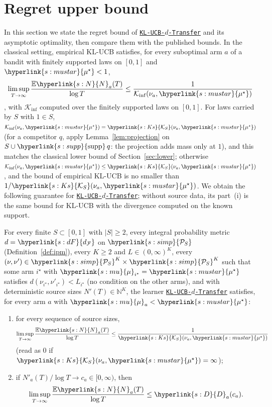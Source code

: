 \documentclass[11pt]{article}
\newcommand{\E}{\mathbb{E}}
\newcommand{\Kinf}{\mathcal{K}_{\inf}}
\newcommand{\sy}[2]{{\hyperlink{#1}{#2}}}
\newcommand{\Simp}{\sy{s:simp}{\mathcal{P}_{S}}}
\newcommand{\supp}{\sy{s:supp}{\mathrm{supp}}}
\newcommand{\Ks}{\sy{s:Ks}{\mathcal{K}_{S}}}
\newcommand{\dF}{\sy{s:dF}{d_{\mathcal F}}}
\newcommand{\mk}{\sy{s:mu}{\mu}}
\newcommand{\mus}{\sy{s:mustar}{\mu^{\star}}}
\newcommand{\Nc}{\sy{s:N}{N}}
\newcommand{\Dc}{\sy{s:D}{D}}
\newcommand{\Alg}{\hyperref[alg:index]{\texttt{KL-UCB-$d$-Transfer}}}
\begin{document}
\section{Regret upper bound}\label{sec:main}\label{sec:upper}

In this section we state the regret bound of \Alg{} and its asymptotic optimality, then compare
them with the published bounds. In the classical setting, empirical KL-UCB satisfies, for every
suboptimal arm $a$ of a bandit with finitely supported laws on $[0,1]$ and $\mus<1$,
\begin{equation*}
\limsup_{T\to\infty}\frac{\E \Nc_a(T)}{\log T}\le\frac{1}{\Kinf(\nu_a,\mus)}
\end{equation*}
\citep[Theorem~2]{CGMMS13}, with $\Kinf$ computed over the finitely supported laws on $[0,1]$. For
laws carried by $S$ with $1\in S$, $\Kinf(\nu_a,\mus)=\Ks(\nu_a,\mus)$ (for a competitor $q$, apply
Lemma~\ref{lem:projection} on $S\cup\supp\,q$: the projection adds mass only at $1$), and this
matches the classical lower bound of Section~\ref{sec:lower}; otherwise $\Kinf(\nu_a,\mus)\le\Ks(\nu_a,\mus)$, and the bound
of empirical KL-UCB is no smaller than $1/\Ks(\nu_a,\mus)$. We obtain the following guarantee for \Alg{}; without source data, its
part~(i) is the same bound for KL-UCB with the divergence computed on the known support.

\begin{theorem}\label{thm:main}
For every finite $S\subset[0,1]$ with $|S|\ge2$, every integral probability metric $d=\dF$
on $\Simp$ (Definition~\ref{def:ipm}), every $K\ge2$ and $L\in(0,\infty)^K$, every
$(\nu,\nu')\in\Simp^K\times\Simp^K$ such that some arm $i^\star$ with $\mk_{i^\star}=\mus$
satisfies $d(\nu_{i^\star},\nu'_{i^\star})<L_{i^\star}$ (no condition on the other arms), and with
deterministic source sizes $N'(T)\in\mathbb N^K$, the learner \Alg{} satisfies, for every arm $a$
with $\mk_a<\mus$:
\begin{enumerate}
\item[(i)] for every sequence of source sizes,
  \begin{equation*}
  \limsup_{T\to\infty}\frac{\E \Nc_a(T)}{\log T}\le\frac{1}{\Ks(\nu_a,\mus)}
  \end{equation*}
  (read as $0$ if $\Ks(\nu_a,\mus)=\infty$);
\item[(ii)] if $N'_a(T)/\log T\to c_a\in[0,\infty)$, then
  \begin{equation*}
  \limsup_{T\to\infty}\frac{\E \Nc_a(T)}{\log T}\le \Dc_a(c_a).
  \end{equation*}
\end{enumerate}
\end{theorem}
\end{document}
